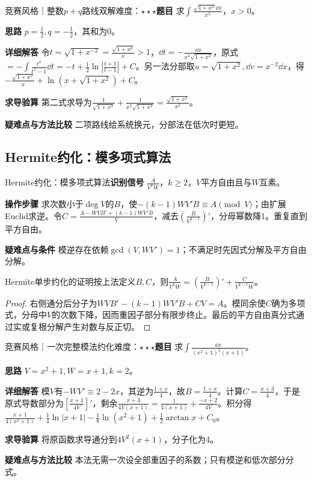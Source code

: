 \begin{example}{竞赛风格｜整数$p+q$路线双解}{难度：$\star\star\star$}\label{ic:ex:indefinite_algebra_complete:binomialsum}\textbf{题目} 求$\int\frac{\sqrt{1+x^2}\dd x}{x^2}$，$x>0$。\par \textbf{思路} $p=\frac{1}{2},q=-\frac{1}{2}$，其和为0。\par \textbf{详细解答} 令$t=\sqrt{1+x^{-2}}=\frac{\sqrt{1+x^2}}{x}>1$，$\dd t=-\frac{\dd x}{x^2\sqrt{1+x^2}}$，原式$=-\int \frac{t^2}{t^2-1}\dd t=-t+\frac12\ln|\frac{t+1}{t-1}|+C$。另一法分部取$u=\sqrt{1+x^2},\dd v=x^{-2}\dd x$，得$-\frac{\sqrt{1+x^2}}{x}+\ln(x+\sqrt{1+x^2})+C$。\par \textbf{求导验算} 第二式求导为$\frac{1}{\sqrt{1+x^2}}+\frac{1}{x^2\sqrt{1+x^2}}=\frac{\sqrt{1+x^2}}{x^2}$。\par \textbf{疑难点与方法比较} 二项路线给系统换元，分部法在低次时更短。\end{example}

\subsection{Hermite约化：模多项式算法}\label{ic:indefinite_algebra_complete:hermitemod}\begin{method}{Hermite约化：模多项式算法}\textbf{识别信号} $\frac{A}{V^kW}$，$k\ge2$，$V$平方自由且与$W$互素。\par \textbf{操作步骤} 求次数小于$\deg V$的$B$，使$-(k-1)WV'B\equiv A\pmod V$；由扩展Euclid求逆。令$C=\frac{A-WVB'+(k-1)WV'B}{V}$，减去$(\frac{B}{V^{k-1}})'$，分母幂数降1。重复直到平方自由。\par \textbf{疑难点与条件} 模逆存在依赖$\gcd(V,WV')=1$；不满足时先因式分解及平方自由分解。\end{method}

\begin{theorem}{Hermite单步约化的证明}按上法定义$B,C$，则$\frac A{V^kW}=\left(\frac B{V^{k-1}}\right)'+\frac C{V^{k-1}W}$。\end{theorem}\begin{proof}右侧通分后分子为$WVB'-(k-1)WV'B+CV=A$。模同余使$C$确为多项式，分母中$V$的次数下降，因而重因子部分有限步终止。最后的平方自由真分式通过实或复根分解产生对数与反正切。\end{proof}

\begin{example}{竞赛风格｜一次完整模法约化}{难度：$\star\star\star$}\label{ic:ex:indefinite_algebra_complete:hermitefull}\textbf{题目} 求$\int\frac{\dd x}{(x^2+1)^2(x+1)}$。\par \textbf{思路} $V=x^2+1,W=x+1,k=2$。\par \textbf{详细解答} 模$V$有$-WV'\equiv2-2x$，其逆为$\frac{1+x}{4}$，故$B=\frac{1+x}{4}$。计算$C=\frac{x+3}{4}$，于是原式导数部分为$[\frac{x+1}{4V}]'$，剩余$\frac{x+3}{4V(x+1)}=\frac{1}{4(x+1)}+\frac{-x+2}{4V}$。积分得$\frac{x+1}{4(x^2+1)}+\frac14\ln|x+1|-\frac18\ln(x^2+1)+\frac12\arctan x+C_0$。\par \textbf{求导验算} 将原函数求导通分到$4V^2(x+1)$，分子化为4。\par \textbf{疑难点与方法比较} 本法无需一次设全部重因子的系数；只有模逆和低次部分分式。\end{example}

